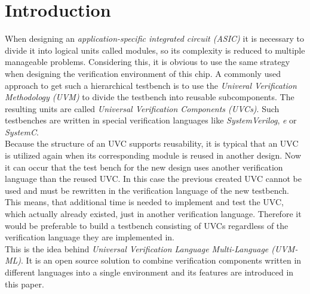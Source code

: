 \section{Introduction}\label{introduction}
When designing an \emph{application-specific integrated circuit (ASIC)} it is
necessary to divide it into logical units called modules, so its complexity is
reduced to multiple manageable problems. Considering this, it is obvious to use the same
strategy when designing the verification environment of this chip. A commonly
used approach to get such a hierarchical testbench is to use the \emph{Univeral
Verification Methodology (UVM)} to divide the testbench into reusable
subcomponents. The resulting units are called \emph{Universal Verification
Components (UVCs)}. Such testbenches are written in special verification
languages like \emph{SystemVerilog}, \emph{e} or \emph{SystemC}.\\
Because the structure of an UVC supports reusability, it is typical that an UVC
is utilized again when its corresponding module is reused in another design. Now
it can occur that the test bench for the new design uses another verification
language than the reused UVC. In this case the previous created UVC cannot be
used and must be rewritten in the verification language of the new testbench.
This means, that additional time is needed to implement and test the UVC, which
actually already existed, just in another verification language. Therefore it
would be preferable to build a testbench consisting of UVCs regardless of the
verification language they are implemented in.\\
This is the idea behind  \emph{Universal Verification Language
Multi-Language (UVM-ML)}. It is an open source solution to combine
verification components written in different languages into a single
environment and its features are introduced in this paper.



